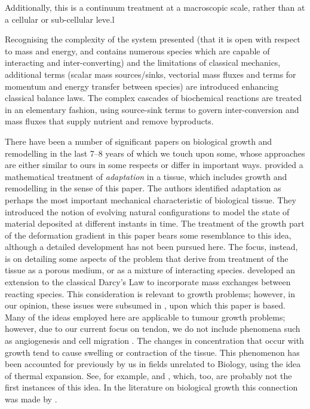  Additionally,
this is a continuum treatment at a macroscopic scale, rather than at a
cellular or sub-cellular leve.l

Recognising the complexity of the system presented (that it is open
with respect to mass and energy, and contains numerous species which
are capable of interacting and inter-converting) and the limitations
of classical  mechanics, additional terms (scalar mass sources/sinks,
vectorial mass fluxes and terms for momentum and energy transfer
between species) are introduced enhancing classical balance laws. The
complex cascades of biochemical reactions are treated in an elementary
fashion, using source-sink terms to govern inter-conversion and mass
fluxes that supply nutrient and remove byproducts.

There have been a number of significant papers on biological growth
and remodelling in the last 7--8 years of which we touch upon some,
whose approaches are either similar to ours in some respects or differ
in important ways. \citet{HumphreyRajagopal:02} provided a
mathematical treatment of \emph{adaptation} in a tissue, which includes 
growth and remodelling in the sense of this paper. The authors
identified adaptation as perhaps the most important mechanical
characteristic of biological tissue. They introduced the notion of evolving
natural configurations to model the state of material deposited at
different instants in time. The treatment of the growth part of the
deformation gradient in this paper bears some resemblance to this
idea, although a detailed development has not been pursued here. The
focus, instead, is on detailing some aspects of the problem that
derive from treatment of the tissue as a porous medium, or as a
mixture of interacting species. \citet{PreziosiFarina:2002} developed an
extension to the classical Darcy's Law to incorporate mass exchanges
between reacting species. This consideration is relevant to growth
problems; however, in our opinion, these issues were subsumed in
\citet{growthpaper}, upon which this paper is based. Many of the ideas
employed here are applicable to tumour growth problems; however, due
to our current focus on tendon, we do not include phenomena
such as angiogenesis and cell migration \citep[see for
  example][]{Brewardetal:2003}. The changes in concentration that
occur with growth tend to cause swelling or contraction of the
tissue. This phenomenon has been accounted for previously by us in fields unrelated to
Biology, using the idea of thermal expansion. See, for
example, \citet{Rao2:00} and \citet{Garikipatietal:01}, which, too,
are probably not the first instances of this idea. In the literature
on biological 
growth this connection was made by \citet{KlischHoger:2003}.

